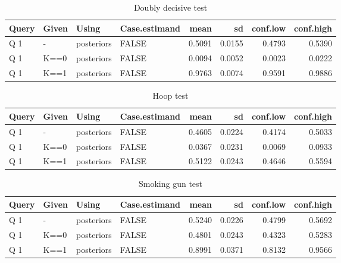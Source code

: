 \documentclass[
  12pt,
]{book}
\begin{document}
\begin{table}

\caption{\label{tab:unnamed-chunk-92}Doubly decisive test}
\centering
\begin{tabular}[t]{l|l|l|l|r|r|r|r}
\hline
Query & Given & Using & Case.estimand & mean & sd & conf.low & conf.high\\
\hline
Q 1 & - & posteriors & FALSE & 0.5091 & 0.0155 & 0.4793 & 0.5390\\
\hline
Q 1 & K==0 & posteriors & FALSE & 0.0094 & 0.0052 & 0.0023 & 0.0222\\
\hline
Q 1 & K==1 & posteriors & FALSE & 0.9763 & 0.0074 & 0.9591 & 0.9886\\
\hline
\end{tabular}
\end{table}

\begin{table}

\caption{\label{tab:unnamed-chunk-92}Hoop test}
\centering
\begin{tabular}[t]{l|l|l|l|r|r|r|r}
\hline
Query & Given & Using & Case.estimand & mean & sd & conf.low & conf.high\\
\hline
Q 1 & - & posteriors & FALSE & 0.4605 & 0.0224 & 0.4174 & 0.5033\\
\hline
Q 1 & K==0 & posteriors & FALSE & 0.0367 & 0.0231 & 0.0069 & 0.0933\\
\hline
Q 1 & K==1 & posteriors & FALSE & 0.5122 & 0.0243 & 0.4646 & 0.5594\\
\hline
\end{tabular}
\end{table}

\begin{table}

\caption{\label{tab:unnamed-chunk-92}Smoking gun test}
\centering
\begin{tabular}[t]{l|l|l|l|r|r|r|r}
\hline
Query & Given & Using & Case.estimand & mean & sd & conf.low & conf.high\\
\hline
Q 1 & - & posteriors & FALSE & 0.5240 & 0.0226 & 0.4799 & 0.5692\\
\hline
Q 1 & K==0 & posteriors & FALSE & 0.4801 & 0.0243 & 0.4323 & 0.5283\\
\hline
Q 1 & K==1 & posteriors & FALSE & 0.8991 & 0.0371 & 0.8132 & 0.9566\\
\hline
\end{tabular}
\end{table}
\end{document}
